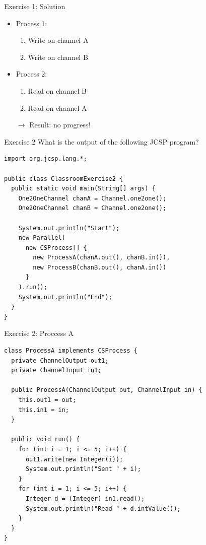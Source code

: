 \begin{frame}{Exercise 1: Solution}
  \begin{itemize}
  \item Process 1:
    \begin{enumerate}
    \item Write on channel A
    \item Write on channel B
    \end{enumerate}
  \item Process 2:
    \begin{enumerate}
    \item Read on channel B
    \item Read on channel A
    \end{enumerate}
  \item[$\rightarrow$] Result: no progress!
  \end{itemize}
\end{frame}

\begin{frame}[fragile]{Exercise 2}
  What is the output of the following JCSP program?


\begin{lstlisting}[basicstyle=\fontsize{9}{11}\selectfont\ttfamily]
import org.jcsp.lang.*;

public class ClassroomExercise2 {
  public static void main(String[] args) {
    One2OneChannel chanA = Channel.one2one();
    One2OneChannel chanB = Channel.one2one();

    System.out.println("Start");
    new Parallel(
      new CSProcess[] { 
        new ProcessA(chanA.out(), chanB.in()),
        new ProcessB(chanB.out(), chanA.in()) 
      }
    ).run();
    System.out.println("End");
  }
}
\end{lstlisting}
\end{frame}

\begin{frame}[fragile]{Exercise 2: Proccess A}
\begin{lstlisting}[basicstyle=\fontsize{9}{11}\selectfont\ttfamily]
class ProcessA implements CSProcess {
  private ChannelOutput out1;
  private ChannelInput in1;

  public ProcessA(ChannelOutput out, ChannelInput in) {
    this.out1 = out;
    this.in1 = in;
  }

  public void run() {
    for (int i = 1; i <= 5; i++) {
      out1.write(new Integer(i));
      System.out.println("Sent " + i);
    }
    for (int i = 1; i <= 5; i++) {
      Integer d = (Integer) in1.read();
      System.out.println("Read " + d.intValue());
    }
  }
}
\end{lstlisting}
\end{frame}

